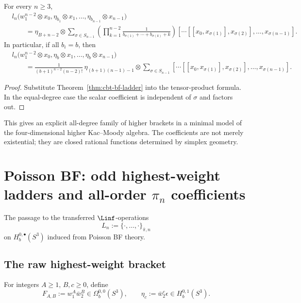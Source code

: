 \begin{theorem}
For every $n\ge3$,
\[
\begin{aligned}
&l_n\bigl(w_1^{n-2}\otimes x_0,\eta_{b_1}\otimes x_1,\dots,\eta_{b_{n-1}}\otimes x_{n-1}\bigr)\\
&\qquad=
\eta_{B+n-2}\otimes
\sum_{\sigma\in S_{n-1}}
\left(\prod_{k=1}^{n-2}\frac{1}{b_{\sigma(1)}+\cdots+b_{\sigma(k)}+k}\right)
[\cdots[[x_0,x_{\sigma(1)}],x_{\sigma(2)}],\dots,x_{\sigma(n-1)}].
\end{aligned}
\]
In particular, if all $b_i=b$, then
\[
\begin{aligned}
&l_n\bigl(w_1^{n-2}\otimes x_0,\eta_b\otimes x_1,\dots,\eta_b\otimes x_{n-1}\bigr)\\
&\qquad=
\frac{1}{(b+1)^{n-2}(n-2)!}\,
\eta_{(b+1)(n-1)-1}\otimes
\sum_{\sigma\in S_{n-1}}
[\cdots[[x_0,x_{\sigma(1)}],x_{\sigma(2)}],\dots,x_{\sigma(n-1)}].
\end{aligned}
\]
\end{theorem}

\begin{proof}
Substitute Theorem~\ref{thm:cbt-bf-ladder} into the tensor-product formula. In the equal-degree case the scalar coefficient is independent of $\sigma$ and factors out.
\end{proof}

\begin{remark}
This gives an explicit all-degree family of higher brackets in a minimal model of the four-dimensional higher Kac--Moody algebra. The coefficients are not merely existential; they are closed rational functions determined by simplex geometry.
\end{remark}

\section{Poisson BF: odd highest-weight ladders and all-order $\pi_n$ coefficients}

The passage to the transferred $\Linf$-operations
\[
L_n:=\{\cdot,\dots,\cdot\}_{\bar\pi,n}
\]
on $H_b^{0,\bullet}(S^3)$ induced from Poisson BF theory.

\subsection{The raw highest-weight bracket}

For integers $A\ge1$, $B,c\ge0$, define
\[
F_{A,B}:=w_1^A\bar w_2^B\in \Omega_b^{0,0}(S^3),
\qquad
\eta_c:=\bar w_2^c\epsilon\in H_b^{0,1}(S^3).
\]

